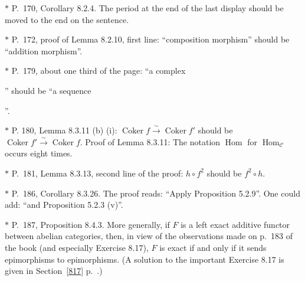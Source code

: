 \documentclass[12pt]{article}%
\theoremstyle{remark}
\theoremstyle{definition}
\newcommand{\C}{\mathcal C}
\newcommand{\xr}{\xrightarrow}
\DeclareMathOperator{\Coker}{Coker}
\DeclareMathOperator{\Hom}{Hom}%
\begin{document}

\noindent $*$ P.~170, Corollary 8.2.4. The period at the end of the last display should be moved to the end on the sentence.


\noindent $*$ P.~172, proof of Lemma 8.2.10, first line: ``composition morphism'' should be ``addition morphism''.


\noindent $*$ P.~179, about one third of the page: ``a complex 
'' 
should be ``a sequence 
''.

\noindent $*$ P. 180, Lemma 8.3.11 (b) (i): $\Coker f\xr\sim\Coker f'$ should be $\Coker f'\xr\sim\Coker f$. Proof of Lemma 8.3.11: The notation $\Hom$ for $\Hom_\C$ occurs eight times.

\noindent $*$ P.~181, Lemma 8.3.13, second line of the proof: $h\circ f^2$ should be $f^2\circ h$.

\noindent $*$ P.~186, Corollary 8.3.26. The proof reads: ``Apply Proposition 5.2.9''. One could add: ``and Proposition 5.2.3 (v)''.

\noindent $*$ P.~187, Proposition 8.4.3. More generally, if $F$ is a left exact additive functor between abelian categories, then, in view of the observations made on p.~183 of the book (and especially Exercise 8.17), $F$ is exact if and only if it sends epimorphisms to epimorphisms. (A solution to the important Exercise 8.17 is given in Section~\ref{817} p.~\pageref{817}.)
\end{document}
